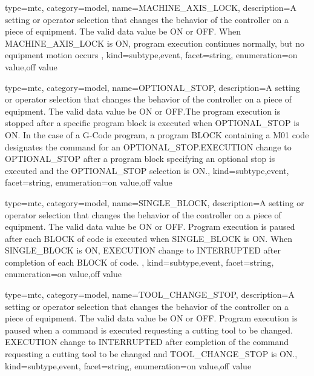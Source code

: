 {
  type=mtc,
  category=model,
  name={MACHINE\_AXIS\_LOCK},
  description={A setting or operator selection that changes the behavior of the controller on a piece of equipment.  The \gls{valid data value} \must be ON or OFF. \newline When MACHINE\_AXIS\_LOCK is ON, program execution continues normally, but no equipment motion occurs },
  kind={subtype,event},
  facet={\gls{string}},
  enumeration={\gls{on value},\gls{off value}}
}


{
  type=mtc,
  category=model,
  name={OPTIONAL\_STOP},
  description={A setting or operator selection that changes the behavior of the controller on a piece of equipment.  The \gls{valid data value} \must be ON or OFF.The program execution is stopped after a specific program block is executed when OPTIONAL\_STOP is ON.    \newline In the case of a G-Code program, a program BLOCK containing a M01 code designates the command for an OPTIONAL\_STOP.EXECUTION \must change to OPTIONAL\_STOP after a program block specifying an optional stop is executed and the OPTIONAL\_STOP selection is ON.},
  kind={subtype,event},
  facet={\gls{string}},
  enumeration={\gls{on value},\gls{off value}}
}


{
  type=mtc,
  category=model,
  name={SINGLE\_BLOCK},
  description={A setting or operator selection that changes the behavior of the controller on a piece of equipment.  The \gls{valid data value} \must be ON or OFF. Program execution is paused after each BLOCK of code is executed when SINGLE\_BLOCK is ON.   \newline When SINGLE\_BLOCK is ON, EXECUTION \must change to INTERRUPTED after completion of each BLOCK of code. },
  kind={subtype,event},
  facet={\gls{string}},
  enumeration={\gls{on value},\gls{off value}}
}


{
  type=mtc,
  category=model,
  name={TOOL\_CHANGE\_STOP},
  description={A setting or operator selection that changes the behavior of the controller on a piece of equipment.  The \gls{valid data value} \must be ON or OFF. Program execution is paused when a command is executed requesting a cutting tool to be changed. EXECUTION \must change to INTERRUPTED after completion of the command requesting a cutting tool to be changed and TOOL\_CHANGE\_STOP is ON.},
  kind={subtype,event},
  facet={\gls{string}},
  enumeration={\gls{on value},\gls{off value}}
}


